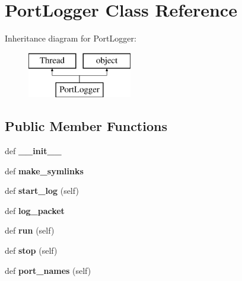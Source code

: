 \section{Port\+Logger Class Reference}
\label{classprotolibs_1_1portlogger_1_1_port_logger}
Inheritance diagram for Port\+Logger\+:\begin{figure}[H]
\begin{center}
\leavevmode
\includegraphics[height=2.000000cm]{classprotolibs_1_1portlogger_1_1_port_logger}
\end{center}
\end{figure}
\subsection*{Public Member Functions}
\begin{DoxyCompactItemize}
\item 
def {\bf \+\_\+\+\_\+init\+\_\+\+\_\+}
\item 
def {\bf make\+\_\+symlinks}
\item 
def {\bf start\+\_\+log} (self)
\item 
def {\bf log\+\_\+packet}
\item 
def {\bf run} (self)
\item 
def {\bf stop} (self)
\item 
def {\bf port\+\_\+names} (self)
\end{DoxyCompactItemize}
